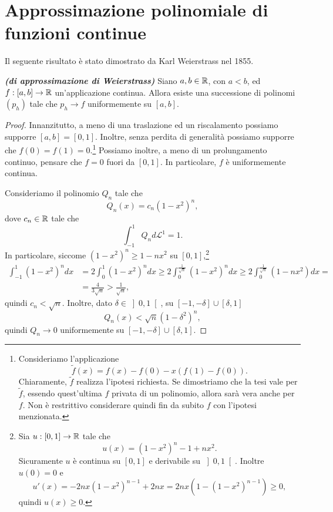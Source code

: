 \section{Approssimazione polinomiale di funzioni continue}
Il seguente risultato è stato dimostrato da Karl Weierstrass nel 1855.
\begin{teorema}\emph{\textbf{(di approssimazione di Weierstrass)}}
Siano $a,b \in \mathbb{R}$, con $a<b$, ed $f : [a,b] \to \mathbb{R}$ un'applicazione continua. Allora esiste una successione di polinomi $(p_h)$ tale che $p_h \to f$ uniformemente su $[a,b]$.
\end{teorema}
\begin{proof}
Innanzitutto, a meno di una traslazione ed un riscalamento possiamo supporre $[a,b] = [0,1]$. Inoltre, senza perdita di generalità possiamo supporre che $f(0) = f(1) = 0$.\footnote{Consideriamo l'applicazione 
	\[ \tilde{f}(x) = f(x) - f(0) -x(f(1) - f(0)).  \]
	Chiaramente, $\tilde{f}$ realizza l'ipotesi richiesta. Se dimostriamo che la tesi vale per $\tilde{f}$, essendo quest'ultima $f$ privata di un polinomio, allora sarà vera anche per $f$. Non è restrittivo considerare quindi fin da subito $f$ con l'ipotesi menzionata.} Possiamo inoltre, a meno di un prolungamento continuo, pensare che $f = 0$ fuori da $[0,1]$. In particolare, $f$ è uniformemente continua.
	
	Consideriamo il polinomio $Q_n$ tale che
	\[ Q_n(x) = c_n(1-x^2)^n, \]
	dove $c_n \in \mathbb{R}$ tale che
	\[ \int_{-1}^1 Q_n d\mathcal{L}^1 = 1. \]
	In particolare, siccome $(1-x^2)^n \ge 1-nx^2$ su $[0,1]$,\footnote{Sia $u:[0,1]\to \mathbb{R}$ tale che
	\[ u(x) = (1-x^2)^n - 1+nx^2. \]
	Sicuramente $u$ è continua su $[0,1]$ e derivabile su $\left] 0,1\right[ $. Inoltre $u(0) = 0$ e 
	\[ u'(x) = -2nx (1-x^2)^{n-1} +2nx = 2nx(1-(1-x^2)^{n-1}) \ge 0, \]
	quindi $u(x) \ge 0$.}
	\begin{align*}
	\int_{-1}^1 (1-x^2)^n dx &= 2 \int_0^1 (1-x^2)^ndx \ge 2\int_{0}^{\frac{1}{\sqrt{n}}}(1-x^2)^n dx \ge 2\int_{0}^{\frac{1}{\sqrt{n}}}(1-nx^2) dx =  \\ 
	&=\frac{4}{3\sqrt{n}} > \frac{1}{\sqrt{n}},
	\end{align*}
	quindi $c_n < \sqrt{n}$. Inoltre, dato $\delta \in \left] 0,1\right[ $, su $[-1,-\delta]\cup [\delta,1]$
	\[ Q_n(x) < \sqrt{n} (1-\delta^2)^n, \]
	quindi $Q_n \to 0$ uniformemente su $[-1,-\delta]\cup [\delta,1]$.
	

\end{proof}
